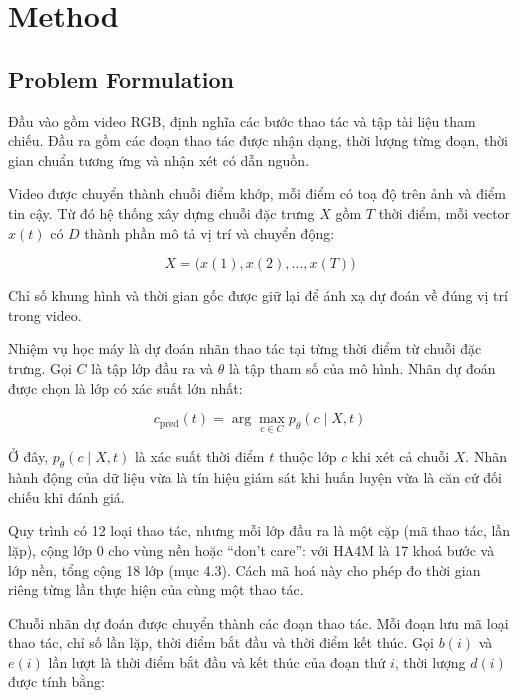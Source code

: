 \section{Method}

\subsection{Problem Formulation}

Đầu vào gồm video RGB, định nghĩa các bước thao tác và tập tài liệu tham chiếu. Đầu ra gồm các đoạn thao tác được nhận dạng, thời lượng từng đoạn, thời gian chuẩn tương ứng và nhận xét có dẫn nguồn.

Video được chuyển thành chuỗi điểm khớp, mỗi điểm có toạ độ trên ảnh và điểm tin cậy. Từ đó hệ thống xây dựng chuỗi đặc trưng $X$ gồm $T$ thời điểm, mỗi vector $x(t)$ có $D$ thành phần mô tả vị trí và chuyển động:

\begin{equation} X = \big(x(1), x(2), \ldots, x(T)\big) \end{equation}

Chỉ số khung hình và thời gian gốc được giữ lại để ánh xạ dự đoán về đúng vị trí trong video.

Nhiệm vụ học máy là dự đoán nhãn thao tác tại từng thời điểm từ chuỗi đặc trưng. Gọi $C$ là tập lớp đầu ra và $\theta$ là tập tham số của mô hình. Nhãn dự đoán được chọn là lớp có xác suất lớn nhất:

\begin{equation} c_{\text{pred}}(t) = \arg\max_{c \in C} p_\theta(c \mid X, t) \end{equation}

Ở đây, $p_\theta(c \mid X, t)$ là xác suất thời điểm $t$ thuộc lớp $c$ khi xét cả chuỗi $X$. Nhãn hành động của dữ liệu vừa là tín hiệu giám sát khi huấn luyện vừa là căn cứ đối chiếu khi đánh giá.

Quy trình có 12 loại thao tác, nhưng mỗi lớp đầu ra là một cặp (mã thao tác, lần lặp), cộng lớp 0 cho vùng nền hoặc “don't care”: với HA4M là 17 khoá bước và lớp nền, tổng cộng 18 lớp (mục 4.3). Cách mã hoá này cho phép đo thời gian riêng từng lần thực hiện của cùng một thao tác.

Chuỗi nhãn dự đoán được chuyển thành các đoạn thao tác. Mỗi đoạn lưu mã loại thao tác, chỉ số lần lặp, thời điểm bắt đầu và thời điểm kết thúc. Gọi $b(i)$ và $e(i)$ lần lượt là thời điểm bắt đầu và kết thúc của đoạn thứ $i$, thời lượng $d(i)$ được tính bằng:

